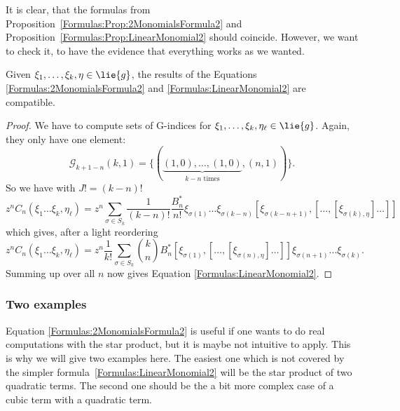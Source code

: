 It is clear, that the formulas from 
Proposition~\ref{Formulas:Prop:2MonomialsFormula2} and 
Proposition~\ref{Formulas:Prop:LinearMonomial2} should coincide. However, 
we want to check it, to have the evidence that everything works as we wanted.
\begin{corollary}
	\label{Formulas:Cor:FormulasCoincide}
	Given $\xi_1, \ldots, \xi_k, \eta \in \lie{g}$, the results of the 
	Equations \eqref{Formulas:2MonomialsFormula2} and 
	\eqref{Formulas:LinearMonomial2} are compatible.
\end{corollary}
\begin{proof}
	We have to compute sets of G-indices for $\xi_1, \ldots, \xi_k, 
	\eta_{\ell} \in \lie{g}$. Again, they only have one element:
	\begin{equation*}
		\mathcal{G}_{k + 1 - n}(k, 1)
		=
		\Big\{
			( 
				\underbrace{(1,0), \ldots, (1,0)}_{
				k - n \text{ times}
				}
				,
				(n,1)
			)
		\Big\}.
	\end{equation*}
	So we have with $J! = (k - n)!$
	\begin{equation*}
		z^n C_n
		\left(
			\xi_1 \ldots \xi_k, \eta_{\ell}
		\right)
		=
		z^n
		\sum\limits_{\sigma \in S_k}
		\frac{1}{(k - n)!}
		\frac{B_n^*}{n!}
		\xi_{\sigma(1)} \ldots \xi_{\sigma(k-n)}
		[\xi_{\sigma(k-n+1)}, [
			\ldots, [\xi_{\sigma(k), \eta} ] \ldots 
		]]
	\end{equation*}
	which gives, after a light reordering
	\begin{equation*}
		z^n C_n
		\left(
			\xi_1 \ldots \xi_k, \eta_{\ell}
		\right)
		=
		z^n
		\frac{1}{k!}
		\sum\limits_{\sigma \in S_k}
		\binom{k}{n} B_n^*
		[\xi_{\sigma(1)}, [
			\ldots, [\xi_{\sigma(n), \eta} ] \ldots 
		]]
		\xi_{\sigma(n+1)} \ldots \xi_{\sigma(k)}.
	\end{equation*}
	Summing up over all $n$ now gives Equation 
	\eqref{Formulas:LinearMonomial2}.
\end{proof}



\subsubsection*{Two examples}
Equation \eqref{Formulas:2MonomialsFormula2} is useful if one wants to do 
real computations with the star product, but it is maybe not intuitive to 
apply. This is why we will give two examples here. The easiest one which is 
not covered by the simpler formula~\eqref{Formulas:LinearMonomial2} will be 
the star product of two quadratic terms. The second one should be the a bit 
more complex case of a cubic term with a quadratic term.

